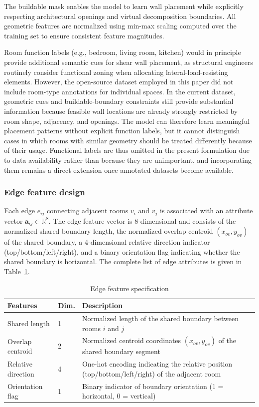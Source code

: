 The buildable mask enables the model to learn wall placement while explicitly respecting architectural openings and virtual decomposition boundaries.
All geometric features are normalized using min-max scaling computed over the training set to ensure consistent feature magnitudes.

Room function labels (e.g., bedroom, living room, kitchen) would in principle provide additional semantic cues for shear wall placement, as structural engineers routinely consider functional zoning when allocating lateral-load-resisting elements. However, the open-source dataset employed in this paper did not include room-type annotations for individual spaces. In the current dataset, geometric cues and buildable-boundary constraints still provide substantial information because feasible wall locations are already strongly restricted by room shape, adjacency, and openings. The model can therefore learn meaningful placement patterns without explicit function labels, but it cannot distinguish cases in which rooms with similar geometry should be treated differently because of their usage. Functional labels are thus omitted in the present formulation due to data availability rather than because they are unimportant, and incorporating them remains a direct extension once annotated datasets become available.

\subsubsection{Edge feature design}
\label{subsubsec:edge_features}

Each edge $e_{ij}$ connecting adjacent rooms $v_i$ and $v_j$ is associated with an attribute vector $\mathbf{a}_{ij} \in \mathbb{R}^{8}$.
The edge feature vector is 8-dimensional and consists of the normalized shared boundary length, the normalized overlap centroid $(x_{ov},y_{ov})$ of the shared boundary, a 4-dimensional relative direction indicator (top/bottom/left/right), and a binary orientation flag indicating whether the shared boundary is horizontal.
The complete list of edge attributes is given in Table~\ref{tab:edge_features}.

\begin{table}[t]
\centering
\caption{Edge feature specification}
\label{tab:edge_features}
\small
\begin{tabularx}{\columnwidth}{llX}
\toprule
Features & Dim. & Description \\\midrule
Shared length & 1 & Normalized length of the shared boundary between rooms $i$ and $j$ \\
Overlap centroid & 2 & Normalized centroid coordinates $(x_{ov}, y_{ov})$ of the shared boundary segment \\
Relative direction & 4 & One-hot encoding indicating the relative position (top/bottom/left/right) of the adjacent room \\
Orientation flag & 1 & Binary indicator of boundary orientation (1 = horizontal, 0 = vertical) \\
\bottomrule
\end{tabularx}
\end{table}

